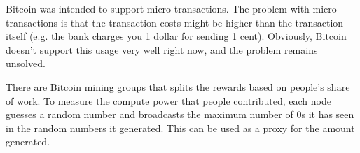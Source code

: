 \documentclass[twoside]{article}
\begin{document}
Bitcoin was intended to support micro-transactions. The problem with micro-transactions is that the transaction costs might be higher than the transaction itself (e.g. the bank charges you 1 dollar for sending 1 cent). Obviously, Bitcoin doesn't support this usage very well right now, and the problem remains unsolved.

There are Bitcoin mining groups that splits the rewards based on people's share of work. To measure the compute power that people contributed, each node guesses a random number and broadcasts the maximum number of 0s it has seen in the random numbers it generated. This can be used as a proxy for the amount generated.
\end{document}
